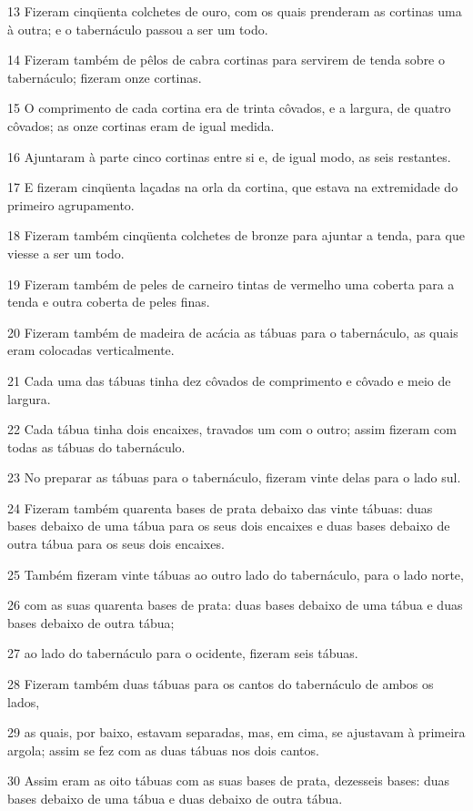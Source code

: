 \par 13 Fizeram cinqüenta colchetes de ouro, com os quais prenderam as cortinas uma à outra; e o tabernáculo passou a ser um todo.
\par 14 Fizeram também de pêlos de cabra cortinas para servirem de tenda sobre o tabernáculo; fizeram onze cortinas.
\par 15 O comprimento de cada cortina era de trinta côvados, e a largura, de quatro côvados; as onze cortinas eram de igual medida.
\par 16 Ajuntaram à parte cinco cortinas entre si e, de igual modo, as seis restantes.
\par 17 E fizeram cinqüenta laçadas na orla da cortina, que estava na extremidade do primeiro agrupamento.
\par 18 Fizeram também cinqüenta colchetes de bronze para ajuntar a tenda, para que viesse a ser um todo.
\par 19 Fizeram também de peles de carneiro tintas de vermelho uma coberta para a tenda e outra coberta de peles finas.
\par 20 Fizeram também de madeira de acácia as tábuas para o tabernáculo, as quais eram colocadas verticalmente.
\par 21 Cada uma das tábuas tinha dez côvados de comprimento e côvado e meio de largura.
\par 22 Cada tábua tinha dois encaixes, travados um com o outro; assim fizeram com todas as tábuas do tabernáculo.
\par 23 No preparar as tábuas para o tabernáculo, fizeram vinte delas para o lado sul.
\par 24 Fizeram também quarenta bases de prata debaixo das vinte tábuas: duas bases debaixo de uma tábua para os seus dois encaixes e duas bases debaixo de outra tábua para os seus dois encaixes.
\par 25 Também fizeram vinte tábuas ao outro lado do tabernáculo, para o lado norte,
\par 26 com as suas quarenta bases de prata: duas bases debaixo de uma tábua e duas bases debaixo de outra tábua;
\par 27 ao lado do tabernáculo para o ocidente, fizeram seis tábuas.
\par 28 Fizeram também duas tábuas para os cantos do tabernáculo de ambos os lados,
\par 29 as quais, por baixo, estavam separadas, mas, em cima, se ajustavam à primeira argola; assim se fez com as duas tábuas nos dois cantos.
\par 30 Assim eram as oito tábuas com as suas bases de prata, dezesseis bases: duas bases debaixo de uma tábua e duas debaixo de outra tábua.
